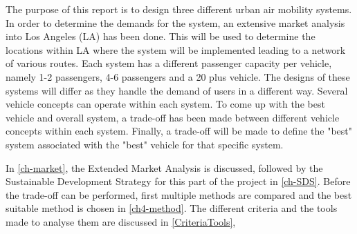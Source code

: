 The purpose of this report is to design three different urban air mobility systems. In order to determine the demands for the system, an extensive market analysis into Los Angeles (LA) has been done. This will be used to determine the locations within LA where the system will be implemented leading to a network of various routes. Each system has a different passenger capacity per vehicle, namely 1-2 passengers, 4-6 passengers and a 20 plus vehicle. The designs of these systems will differ as they handle the demand of users in a different way. Several vehicle concepts can operate within each system. To come up with the best vehicle and overall system, a trade-off has been made between different vehicle concepts within each system. Finally, a trade-off will be made to define the "best" system associated with the "best" vehicle for that specific system. 

In \autoref{ch-market}, the Extended Market Analysis is discussed, followed by the Sustainable Development Strategy for this part of the project in \autoref{ch-SDS}. Before the trade-off can be performed, first multiple methods are compared and the best suitable method is chosen in \autoref{ch4-method}. The different criteria and the tools made to analyse them are discussed in \autoref{CriteriaTools}, 